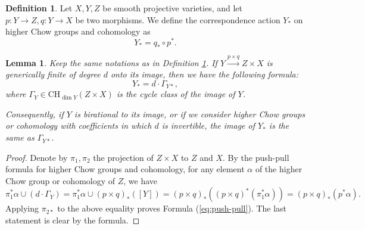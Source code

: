 \documentclass{amsart}
\newtheorem{lem}[theorem]{Lemma}
\theoremstyle{definition}
\newtheorem{defn}[theorem]{Definition}
\theoremstyle{remark}
\begin{document}
\begin{defn}\label{defn:corr}
    Let $X, Y, Z$ be smooth projective varieties, and let $p:Y \to Z, q:Y \to X$ be two morphisms. We define the correspondence action $Y_*$ on higher Chow groups and cohomology as
    \[
    Y_*=q_*\circ p^*.
    \]
\end{defn}
\begin{lem}\label{lem:image_corr}
    Keep the same notations as in Definition \ref{defn:corr}. If $Y \xrightarrow{p\times q} Z\times X$ is generically finite of degree $d$ onto its image, then we have the following formula:
\begin{equation}\label{eq:push-pull}
    Y_*=d \cdot \Gamma_{Y*},
\end{equation}
where $\Gamma_Y \in \text{CH}_{\dim Y}(Z\times X)$ is the cycle class of the image of $Y$. 

Consequently, if $Y$ is birational to its image, or if we consider higher Chow groups or cohomology with coefficients in which $d$ is invertible, the image of $Y_*$ is the same as $\Gamma_{Y*}$.
\end{lem}
\begin{proof}
Denote by $\pi_1, \pi_2$ the projection of $Z \times X$ to $Z$ and $X$.
    By the push-pull formula for higher Chow groups and cohomology, for any element $\alpha$ of the higher Chow group or cohomology of $Z$, we have
    \[
    \pi_1^*\alpha \cup (d\cdot \Gamma_Y)=\pi_1^*\alpha \cup (p\times q)_*([Y])=(p\times q)_*((p\times q)^* (\pi_1^*\alpha))=(p\times q)_*(p^*\alpha).
    \]
    Applying $\pi_{2*}$ to the above equality proves Formula (\ref{eq:push-pull}). The last statement is clear by the formula.
\end{proof}    
\end{document}
